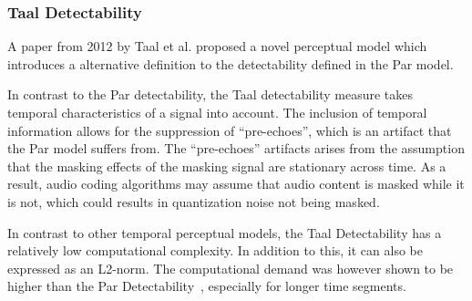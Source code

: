 \subsubsection{Taal Detectability}
A paper from 2012 by Taal et al. proposed a novel perceptual model \cite{taal2012low} which introduces a
alternative definition to the detectability defined in the Par model.

In contrast to the Par detectability, the Taal detectability measure takes temporal characteristics of a signal into account.
The inclusion of temporal information allows for the suppression of ``pre-echoes'', which is an artifact that 
the Par model suffers from. 
The ``pre-echoes'' artifacts arises from the assumption that the masking effects of the masking signal are stationary across 
time. 
As a result, audio coding algorithms may assume that audio content is masked while it is not, which could results in quantization
noise not being masked.

In contrast to other temporal perceptual models, the Taal Detectability has a relatively low computational complexity.
In addition to this, it can also be expressed as an L2-norm.
The computational demand was however shown to be higher than the Par Detectability~\cite{taal2012low}, especially for longer time segments.
